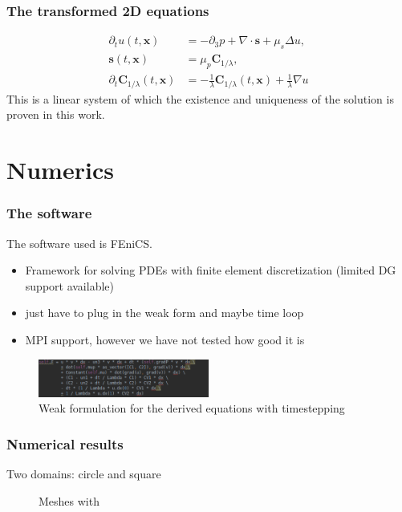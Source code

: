 \documentclass[12pt,a4paper]{beamer}
\theoremstyle{definition}
\theoremstyle{plain}
\newcommand{\bfs}{\bm{s}}
\newcommand{\bfC}{\bm{C}}
\newcommand{\bfx}{\bm{x}}
\begin{document}
\begin{frame}
    \frametitle{The transformed 2D equations}
    \begin{align*}
        \partial_t u(t,\bfx) &= -\partial_3 p +\nabla\cdot \bfs+\mu_s\Delta u,\\
        \label{eq:transfeq2}
        \bfs(t,\bfx)&=\mu_p\bfC_{1/\lambda},\\
        \partial_t\bfC_{1/\lambda}(t,\bfx) &= -\frac{1}{\lambda}\bfC_{1/\lambda}(t,\bfx)+\frac{1}{\lambda}\nabla u    \end{align*}
        This is a linear system of which the existence and uniqueness of the solution is proven in this work.
\end{frame}
\section{Numerics}
\begin{frame}
    \frametitle{The software}
    The software used is FEniCS. 
    \begin{itemize}[<+->]
        \item Framework for solving PDEs with finite element discretization (limited DG support available)
        \item just have to plug in the weak form and maybe time loop
        \item MPI support, however we have not tested how good it is 
    \end{itemize}
    \begin{figure}
        \includegraphics[width=0.5\textwidth]{FenicsCode}
        \caption{Weak formulation for the derived equations with timestepping}
    \end{figure}
\end{frame}
\begin{frame}
    \frametitle{Numerical results}
    Two domains: circle and square
    \begin{figure}
        \caption{Meshes with }
    \end{figure}
\end{frame}
\end{document}
